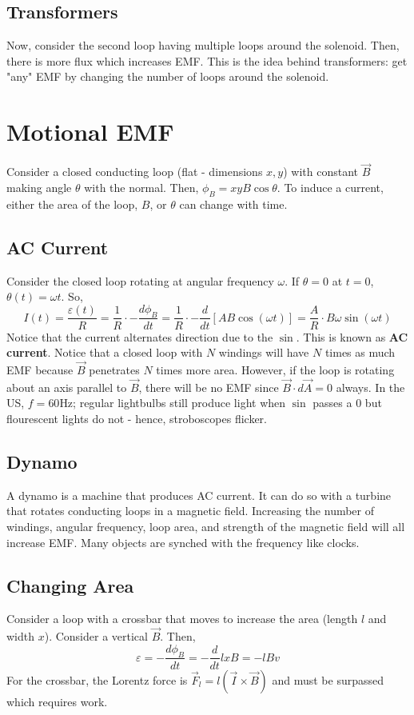 \documentclass{article}
\begin{document}
\subsection{Transformers}
Now, consider the second loop having multiple loops around the solenoid. Then, there is more flux which increases EMF.
This is the idea behind transformers: get "any" EMF by changing the number of loops around the solenoid.

\section{Motional EMF}
Consider a closed conducting loop (flat - dimensions $x,y$) with constant $\vec{B}$ making angle $\theta$ with the normal.
Then, $\phi_{B}=xyB\cos\theta$. To induce a current, either the area of the loop, $B$, or $\theta$ can change with time.

\subsection{AC Current}
Consider the closed loop rotating at angular frequency $\omega$. If $\theta=0$ at $t=0$, $\theta(t)=\omega t$.
So, $$I(t)=\frac{\varepsilon(t)}{R}=\frac{1}{R}\cdot -\frac{d\phi_{B}}{dt}
=\frac{1}{R}\cdot -\frac{d}{dt}\left[AB\cos (\omega t)\right]
=\frac{A}{R}\cdot B\omega \sin (\omega t)
$$
Notice that the current alternates direction due to the $\sin$. This is known as \textbf{AC current}. Notice 
that a closed loop with $N$ windings will have $N$ times as much EMF because $\vec{B}$ penetrates $N$ times more area.
However, if the loop is rotating about an axis parallel to $\vec{B}$, there will be no EMF since $\vec{B}\cdot d\vec{A}=0$
always. In the US, $f=60\text{Hz}$; regular lightbulbs still produce light when $\sin$ passes a $0$ but flourescent lights 
do not - hence, stroboscopes flicker.

\subsection{Dynamo}
A dynamo is a machine that produces AC current.
It can do so with a turbine that rotates conducting loops in a magnetic field. Increasing the number of windings, angular frequency,
loop area, and strength of the magnetic field will all increase EMF. Many objects are synched with the frequency like clocks.

\subsection{Changing Area}
Consider a loop with a crossbar that moves to increase the area (length $l$ and width $x$). Consider a vertical $\vec{B}$.
Then,
$$\varepsilon=-\frac{d\phi_{B}}{dt}=-\frac{d}{dt}lxB=-lBv$$
For the crossbar, the Lorentz force is $\vec{F}_{l}=l(\vec{I}\times\vec{B})$ and must be surpassed which requires work.
\end{document}
